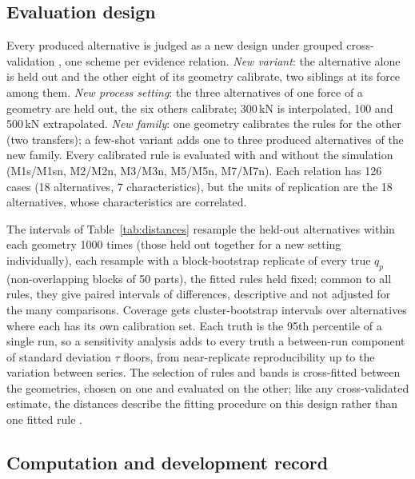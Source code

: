 \documentclass[pdflatex,sn-basic,lineno]{sn-jnl}
\begin{document}
\subsection{Evaluation design}\label{sec:evaldesign}

Every produced alternative is judged as a new design under grouped cross-validation \citep{roberts2017cross}, one scheme per evidence relation. \emph{New variant}: the alternative alone is held out and the other eight of its geometry calibrate, two siblings at its force among them. \emph{New process setting}: the three alternatives of one force of a geometry are held out, the six others calibrate; 300\,kN is interpolated, 100 and 500\,kN extrapolated. \emph{New family}: one geometry calibrates the rules for the other (two transfers); a few-shot variant adds one to three produced alternatives of the new family. Every calibrated rule is evaluated with and without the simulation (M1s/M1sn, M2/M2n, M3/M3n, M5/M5n, M7/M7n). Each relation has 126 cases (18 alternatives, 7 characteristics), but the units of replication are the 18 alternatives, whose characteristics are correlated.

The intervals of Table~\ref{tab:distances} resample the held-out alternatives within each geometry 1000 times (those held out together for a new setting individually), each resample with a block-bootstrap replicate of every true $q_p$ (non-overlapping blocks of 50 parts), the fitted rules held fixed; common to all rules, they give paired intervals of differences, descriptive and not adjusted for the many comparisons. Coverage gets cluster-bootstrap intervals over alternatives where each has its own calibration set. Each truth is the 95th percentile of a single run, so a sensitivity analysis adds to every truth a between-run component of standard deviation $\tau$ floors, from near-replicate reproducibility up to the variation between series. The selection of rules and bands is cross-fitted between the geometries, chosen on one and evaluated on the other; like any cross-validated estimate, the distances describe the fitting procedure on this design rather than one fitted rule \citep{bates2024cross}.

\subsection{Computation and development record}\label{sec:computation}
\end{document}
